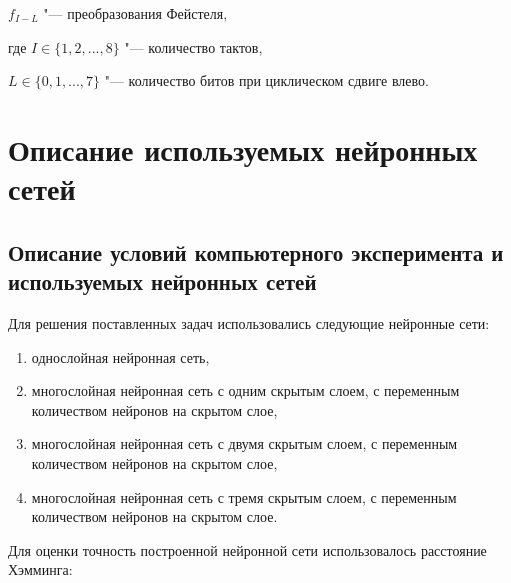   $f_{I-L}$ "--- преобразования Фейстеля,
  
  где $I \in \{1,2,...,8\}$ "--- количество тактов,
  
  $L \in \{0,1,...,7\}$ "--- количество битов при циклическом сдвиге влево.  	
  \bigskip	
  
  \newpage
  \section{Описание используемых нейронных сетей}
  \subsection{Описание условий компьютерного эксперимента и используемых нейронных сетей}
  
Для решения поставленных задач использовались следующие нейронные сети:
 
\begin{enumerate}
 	\item однослойная нейронная сеть,
	\item многослойная нейронная сеть с одним скрытым слоем, с переменным количеством нейронов на скрытом слое,
	\item многослойная нейронная сеть с двумя скрытым слоем, с переменным количеством нейронов на скрытом слое,
	\item многослойная нейронная сеть с тремя скрытым слоем, с переменным количеством нейронов на скрытом слое.
\end{enumerate}
  
  	
  
  \bigskip
  Для оценки точность построенной нейронной сети использовалось расстояние Хэмминга:
  
